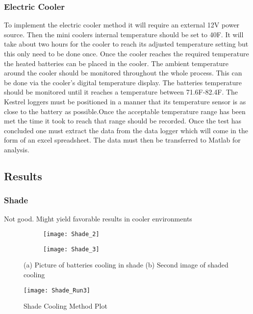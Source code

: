 \documentclass[12pt]{article}
\begin{document}
\subsubsection{Electric Cooler}
To implement the electric cooler method it will require an external 12V power source. Then the mini coolers internal temperature should be set to 40\degree F. It will take about two hours for the cooler to reach its adjusted temperature setting but this only need to be done once. Once the cooler reaches the required temperature the heated batteries can be placed in the cooler. The ambient temperature around the cooler should be monitored throughout the whole process. This can be done via the cooler's digital temperature display. The batteries temperature should be monitored until it reaches a temperature between 71.6\degree F-82.4\degree F. The Kestrel loggers must be positioned in a manner that its temperature sensor is as close to the battery as possible.Once the acceptable temperature range has been met the time it took to reach that range should be recorded. Once the test has concluded one must extract the data from the data logger which will come in the form of an excel spreadsheet. The data must then be transferred to Matlab for analysis.


\subsection{Results}

\subsubsection{Shade}

Not good. Might yield favorable results in cooler environments

\begin{figure}[H]
\centering
\begin{subfigure}[b]{0.45\textwidth}
\centering
\texttt{[image: Shade\_2]}
\caption{}
\label{fig: Shade 2}
\end{subfigure}
\hfill
\begin{subfigure}[b]{0.45\textwidth}
\centering
\texttt{[image: Shade\_3]}
\caption{}
\label{fig: Shade 3}
\end{subfigure}
\caption{(a) Picture of batteries cooling in shade (b) Second image of shaded cooling}
\label{fig: Shaded Method}
\end{figure}


\begin{figure}[H]
	\centering
	\texttt{[image: Shade\_Run3]}
	\caption{Shade Cooling Method Plot}
	\label{fig:Air-Conditioned}
\end{figure}
\end{document}

